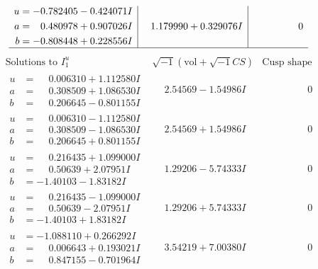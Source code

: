 \documentclass[1p]{elsarticle_modified}
\theoremstyle{definition}
\newcommand{\I}{\sqrt{-1}}
\begin{document}
$$\begin{array}{c|c|c}
\begin{aligned}
u &= -0.782405 - 0.424071 I \\
a &= \phantom{-}0.480978 + 0.907026 I \\
b &= -0.808448 + 0.228556 I\end{aligned}
 & \phantom{-}1.179990 + 0.329076 I & \phantom{-0.000000 } 0\\
 \hline 
 \end{array}$$\newpage$$\begin{array}{c|c|c}  
\text{Solutions to }I^u_{1}& \I (\text{vol} + \sqrt{-1}CS) & \text{Cusp shape}\\
 \hline 
\begin{aligned}
u &= \phantom{-}0.006310 + 1.112580 I \\
a &= \phantom{-}0.308509 + 1.086530 I \\
b &= \phantom{-}0.206645 - 0.801155 I\end{aligned}
 & \phantom{-}2.54569 - 1.54986 I & \phantom{-0.000000 } 0 \\ \hline\begin{aligned}
u &= \phantom{-}0.006310 - 1.112580 I \\
a &= \phantom{-}0.308509 - 1.086530 I \\
b &= \phantom{-}0.206645 + 0.801155 I\end{aligned}
 & \phantom{-}2.54569 + 1.54986 I & \phantom{-0.000000 } 0 \\ \hline\begin{aligned}
u &= \phantom{-}0.216435 + 1.099000 I \\
a &= \phantom{-}0.50639 + 2.07951 I \\
b &= -1.40103 - 1.83182 I\end{aligned}
 & \phantom{-}1.29206 - 5.74333 I & \phantom{-0.000000 } 0 \\ \hline\begin{aligned}
u &= \phantom{-}0.216435 - 1.099000 I \\
a &= \phantom{-}0.50639 - 2.07951 I \\
b &= -1.40103 + 1.83182 I\end{aligned}
 & \phantom{-}1.29206 + 5.74333 I & \phantom{-0.000000 } 0 \\ \hline\begin{aligned}
u &= -1.088110 + 0.266292 I \\
a &= \phantom{-}0.006643 + 0.193021 I \\
b &= \phantom{-}0.847155 - 0.701964 I\end{aligned}
 & \phantom{-}3.54219 + 7.00380 I & \phantom{-0.000000 } 0 \\ \hline\begin{aligned}

\end{aligned}
\end{array}$$
\end{document}
